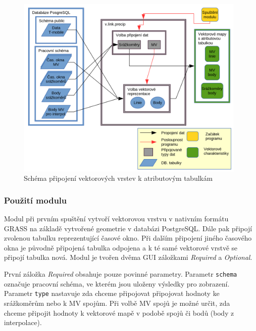\documentclass[a4paper,12pt,oneside]{report}
\begin{document}
 
\begin{figure}[h!]
    \centering
    \includegraphics[width=1\textwidth]{./img/grass/diagram2.png}
    \caption[GUI modul]{Schéma připojení vektorových vrstev k atributovým tabulkám \centering  }
        \label{fig:baseline}
 \end{figure}

\subsubsection{Použití modulu}
Modul při prvním spuštění vytvoří vektorovou vrstvu v nativním
formátu GRASS na základě vytvořené geometrie v databázi
PostgreSQL. Dále pak připojí zvolenou tabulku reprezentující časové
okno. Při dalším připojení jiného časového okna je původně připojená
tabulka odpojena a k té samé vektorové vrstvě se připojí tabulka nová. Modul
je tvořen dvěma GUI záložkami \textit{Required} a \textit{Optional}.

První záložka \textit{Required} obsahuje pouze povinné parametry.
Parametr \texttt{schema} označuje pracovní schéma, ve kterém jsou
uloženy výsledky pro zobrazení. Parametr \texttt{type} nastavuje zda chceme
připojovat připojovat hodnoty ke srážkoměrům nebo k MV spojům.
Při volbě MV spojů je možné určit, zda chceme připojit hodnoty k 
vektorové mapě v podobě spojů či bodů (body z interpolace).
\end{document}
